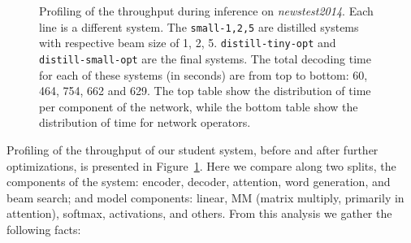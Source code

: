 \documentclass[11pt,a4paper]{article}
\begin{document}
\begin{figure}
\caption{\small Profiling of the throughput during inference on {\it newstest2014}. Each line is a different system. The {\tt small-1,2,5} are distilled systems with respective beam size of 1, 2, 5. {\tt distill-tiny-opt} and {\tt distill-small-opt} are the final systems. The total decoding time for each of these systems (in seconds) are from top to bottom: 60, 464, 754, 662 and 629. The top table show the distribution of time per component of the network, while the bottom table show the distribution of time for network operators.}
\label{fig:decoding_cost}
\end{figure}


Profiling of the throughput of our student system, before
and after further optimizations, is presented in Figure~\ref{fig:decoding_cost}. Here we compare along two splits,
the components of the system: encoder, decoder, attention, word generation, and beam search; and model components: linear, MM (matrix multiply, primarily in attention), softmax, activations, and others.
From this analysis we gather the following facts:
\end{document}
